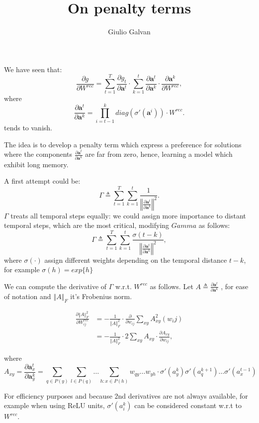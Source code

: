 \documentclass{article}
\title{On penalty terms}
\author{Giulio Galvan}
\renewcommand{\vec}[1]{\boldsymbol{#1}}
\newcommand{\mat}[1]{#1}
\newcommand{\norm}[1]{\left\Vert #1 \right\Vert}
\newcommand{\defeq}{\triangleq}
\begin{document}
	\maketitle

We have seen that:
\begin{equation}
	\frac{\partial g}{\partial \mat{W}^{rec}}= \sum_{t=1}^T\frac{\partial g_t}{\partial \vec{a}^t} \cdot \sum_{k=1}^t \frac{\partial \vec{a}^t}{\partial \vec{a}^k} \cdot \frac{\partial \vec{a}^k}{\partial \mat{W}^{rec}},
\end{equation}
where 
\begin{equation}
	\frac{\partial \vec{a}^t}{\partial \vec{a}^k} = \prod_{i=t-1}^{k}  diag(\sigma'(\vec{a}^i)) \cdot \mat{W}^{rec}.
	\label{eq:temporalComponent}
\end{equation}
tends to vanish.

The idea is to develop a penalty term which express a preference for solutions where the components $\frac{\partial \vec{a}^t}{\partial \vec{a}^k}$ are far from zero, hence, learning a model which exhibit long memory.

A first attempt could be:
\begin{equation}
\Gamma \defeq \sum_{t=1}^T\sum_{k=1}^t \frac{1}{\norm{\frac{\partial \vec{a}^t}{\partial \vec{a}^k}}^2}.
\end{equation}
$\Gamma$ treats all temporal steps equally: we could assign more importance to distant temporal steps, which are the most critical, modifying $Gamma$ as follows:
\begin{equation}
\Gamma \defeq \sum_{t=1}^T\sum_{k=1}^t \frac{\sigma(t-k)}{\norm{\frac{\partial \vec{a}^t}{\partial \vec{a}^k}}^2},
\end{equation}
where $\sigma(\cdot)$ assign different weights depending on the temporal distance $t-k$, for example $\sigma(h)=exp\{h\}$

We can compute the derivative of $\Gamma$ w.r.t. $\mat{W}^{rec}$ as follows.
Let $A\defeq\frac{\partial \vec{a}^t}{\partial \vec{a}^k}$	, for ease of notation and $\norm{A}_F$ it's Frobenius norm.

\begin{align}
	\frac{\partial \norm{A}^2_F}{\partial \mat{W}_{ij}^{rec}}&=- \frac{1}{\norm{A}^2_F}\cdot \frac{\partial}{\partial w_{ij}} \sum_{xy} A_{xy}^2(w_ij)\\
	&=- \frac{1}{\norm{A}^2_F}\cdot 2\sum_{xy} A_{xy}\cdot \frac{\partial A_{xy}}{\partial w_{ij}},
\end{align}

where \begin{equation} 
A_{xy}=\frac{\partial \vec{a}_x^t}{\partial \vec{a}_y^k} = \sum_{q\in P(y)} \sum_{l \in P(q)} \hdots \sum_{h : x \in P(h)} w_{qy} \hdots w_{yh} \cdot \sigma'(a_y^k)\sigma'(a_q^{k+1}) \hdots \sigma'(a_x^{t-1})
\label{expanded_mem}
\end{equation}

For efficiency purposes and because 2nd derivatives are not always available, for example when using ReLU units, $\sigma'(a_i^k)$ can be considered constant w.r.t to $\mat{W^{rec}}$.
\end{document}
